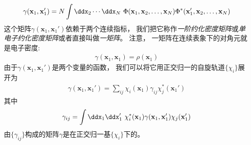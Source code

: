 \begin{align}
\label{4.35}
\gamma(\mathbf{x}_1,\mathbf{x}_1') = N \int\ddx_2\cdots\ddx_N \,\, \Phi(\mathbf{x}_1,\mathbf{x}_2,\ldots,\mathbf{x}_N)\Phi^*(\mathbf{x}_1',\mathbf{x}_2,\ldots,\mathbf{x}_N)
\end{align}
这个矩阵$\gamma(\mathbf{x}_1,\mathbf{x}_1')$依赖于两个连续指标，
我们把它称作\emph{一阶约化密度矩阵}或\emph{单电子约化密度矩阵}或者直接叫做\emph{一矩阵}。
注意，
一矩阵在连续表象下的对角元就是电子密度:
\begin{align}
\gamma(\mathbf{x}_1,\mathbf{x}_1) = \rho(\mathbf{x}_1)
\end{align}
由于$\gamma(\mathbf{x}_1,\mathbf{x}_1')$是两个变量的函数，
我们可以将它用正交归一的\hft 自旋轨道$\{\chi_i\}$展开为
\begin{align}
\gamma(\mathbf{x}_1,\mathbf{x}_1') = \sum_{ij} \chi_i(\mathbf{x}_1) \gamma_{ij} \chi_j^*(\mathbf{x}_1')
\label{4.37}
\end{align}
其中
\begin{align}
\gamma_{ij} = \int\ddx_1\ddx_1'\,\,\chi_i^*(\mathbf{x}_1)\gamma(\mathbf{x}_1,\mathbf{x}_1')\chi_j(\mathbf{x}_1')
\end{align}
由$\{\gamma_{ij}\}$构成的矩阵$\gamma$是在正交归一基$\{\chi_i\}$下的。



